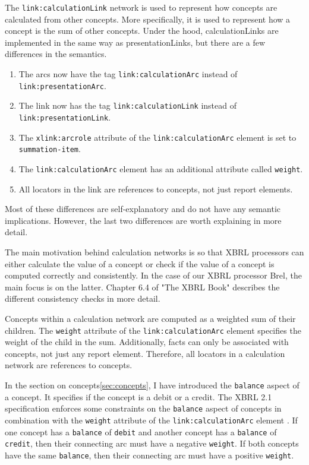 The \texttt{link:calculationLink} network is used to represent how concepts are calculated from other concepts.
More specifically, it is used to represent how a concept is the sum of other concepts.
Under the hood, calculationLinks are implemented in the same way as presentationLinks, but there are a few differences in the semantics.

\begin{enumerate}
    \item The arcs now have the tag \texttt{link:calculationArc} instead of \texttt{link:presentationArc}.
    \item The link now has the tag \texttt{link:calculationLink} instead of \texttt{link:presentationLink}.
    \item The \texttt{xlink:arcrole} attribute of the \texttt{link:calculationArc} element is set to \texttt{summation-item}.
    \item The \texttt{link:calculationArc} element has an additional attribute called \texttt{weight}.
    \item All locators in the link are references to concepts, not just report elements.
\end{enumerate}

Most of these differences are self-explanatory and do not have any semantic implications.
However, the last two differences are worth explaining in more detail.

The main motivation behind calculation networks is so that XBRL processors can either calculate the value of a concept or check if the value of a concept is computed correctly and consistently.
In the case of our XBRL processor Brel, the main focus is on the latter. 
Chapter 6.4 of "The XBRL Book" \cite{fourny2023xbrl} describes the different consistency checks in more detail.

Concepts within a calculation network are computed as a weighted sum of their children.
The \texttt{weight} attribute of the \texttt{link:calculationArc} element specifies the weight of the child in the sum.
Additionally, facts can only be associated with concepts, not just any report element.
Therefore, all locators in a calculation network are references to concepts.

In the section on concepts\ref{sec:concepts}, I have introduced the \texttt{balance} aspect of a concept.
It specifies if the concept is a debit or a credit.
The XBRL 2.1 specification enforces some constraints on the \texttt{balance} aspect of concepts in combination with the \texttt{weight} attribute of the \texttt{link:calculationArc} element \cite{xbrl21_concept}.
If one concept has a \texttt{balance} of \texttt{debit} and another concept has a \texttt{balance} of \texttt{credit}, then their connecting arc must have a negative \texttt{weight}.
If both concepts have the same \texttt{balance}, then their connecting arc must have a positive \texttt{weight}.

